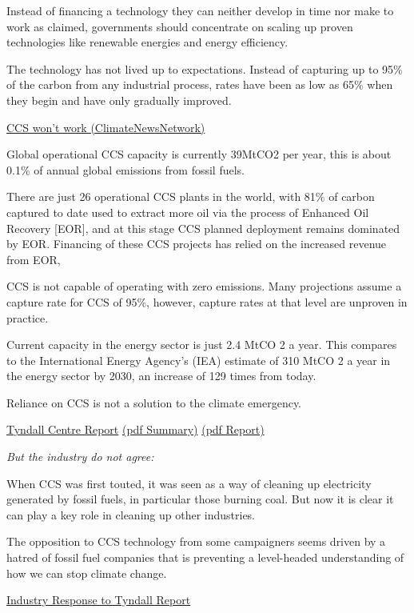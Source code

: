 \documentclass[
]{book}
\begin{document}
Instead of financing a technology they can neither develop in time
nor make to work as claimed,
governments should concentrate on scaling up proven technologies
like renewable energies and energy efficiency.

The technology has not lived up to expectations.
Instead of capturing up to 95\% of the carbon from any industrial process,
rates have been as low as 65\% when they begin and have only gradually improved.

\href{https://climatenewsnetwork.net/carbon-capture-and-storage-wont-work-critics-say/}{CCS won't work (ClimateNewsNetwork)}

Global operational CCS capacity is currently 39MtCO2 per year,
this is about 0.1\% of annual global emissions from fossil fuels.

There are just 26 operational CCS plants in the world,
with 81\% of carbon captured to date used to extract more oil
via the process of Enhanced Oil Recovery {[}EOR{]}, and at this stage
CCS planned deployment remains dominated by EOR.
Financing of these CCS projects has relied on the increased revenue from EOR,

CCS is not capable of operating with zero emissions.
Many projections assume a capture rate for CCS of 95\%, however,
capture rates at that level are unproven in practice.

Current capacity in the energy sector is just 2.4 MtCO 2 a year.
This compares to the International Energy Agency's (IEA) estimate of 310 MtCO 2 a year in the
energy sector by 2030, an increase of 129 times from today.

Reliance on CCS is not a solution to the climate emergency.

\href{https://foe.scot/resource/report-carbon-capture-storage-energy-role/}{Tyndall Centre Report}
\href{pdf/Tyndall_2020_CCS-Summary.pdf}{(pdf Summary)}
\href{pdf/Tyndall_2020_CCS-Report.pdf}{(pdf Report)}

\emph{But the industry do not agree:}

When CCS was first touted, it was seen as a way of cleaning up
electricity generated by fossil fuels, in particular those burning coal.
But now it is clear it can play a key role in cleaning up other industries.

The opposition to CCS technology from some campaigners seems
driven by a hatred of fossil fuel companies that is
preventing a level-headed understanding of how we can stop climate change.

\href{https://www.theguardian.com/environment/2021/jan/16/carbon-capture-vital-meeting-climate-goals-scientists-cut-emissions}{Industry Response to Tyndall Report}
\end{document}
